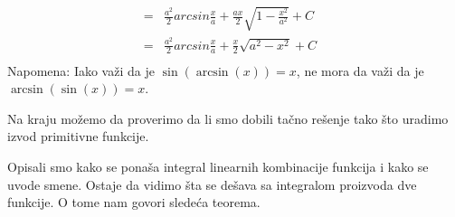 \documentclass{article}
\begin{document}
\begin{primbox}
\begin{align*}
        = & \frac{a^2}{2}arcsin\frac{x}{a} + \frac{a x}{2}\sqrt{1-\frac{x^2}{a^2}} + C                       &                                                     \\
        = & \frac{a^2}{2}arcsin\frac{x}{a} + \frac{x}{2}\sqrt{a^2-x^2} + C                                   &                                                     \\
    \end{align*}
    \label{napomena_1_primer_1.9}Napomena: Iako važi da je $\sin(\arcsin(x))=x$, ne mora da važi da je $\arcsin(\sin(x))=x$.\par
    Na kraju možemo da proverimo da li smo dobili tačno rešenje tako što uradimo izvod primitivne funkcije.
\end{primbox}

Opisali smo kako se ponaša integral linearnih kombinacije funkcija i kako se uvode smene. Ostaje da vidimo
šta se dešava sa integralom proizvoda dve funkcije. O tome nam govori sledeća teorema.
\end{document}
